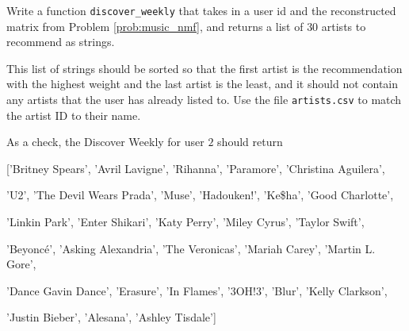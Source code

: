 \begin{problem}
Write a function \texttt{discover\_weekly} that takes in a user id and the reconstructed matrix from Problem \ref{prob:music_nmf}, and returns a list of $30$ artists to recommend as strings.

This list of strings should be sorted so that the first artist is the recommendation with the highest weight and the last artist is the least, and it should not contain any artists that the user has already listed to.
Use the file \texttt{artists.csv} to match the artist ID to their name.

\noindent As a check, the Discover Weekly for user $2$ should return 

['Britney Spears', 'Avril Lavigne', 'Rihanna', 'Paramore', 'Christina Aguilera', 

'U2', 'The Devil Wears Prada', 'Muse', 'Hadouken!', 'Ke\$ha', 'Good Charlotte', 

'Linkin Park', 'Enter Shikari', 'Katy Perry', 'Miley Cyrus', 'Taylor Swift', 

'Beyoncé', 'Asking Alexandria', 'The Veronicas', 'Mariah Carey', 'Martin L. Gore', 

'Dance Gavin Dance', 'Erasure', 'In Flames', '3OH!3', 'Blur', 'Kelly Clarkson', 

'Justin Bieber', 'Alesana', 'Ashley Tisdale']



       

      
       
       
      

\end{problem}